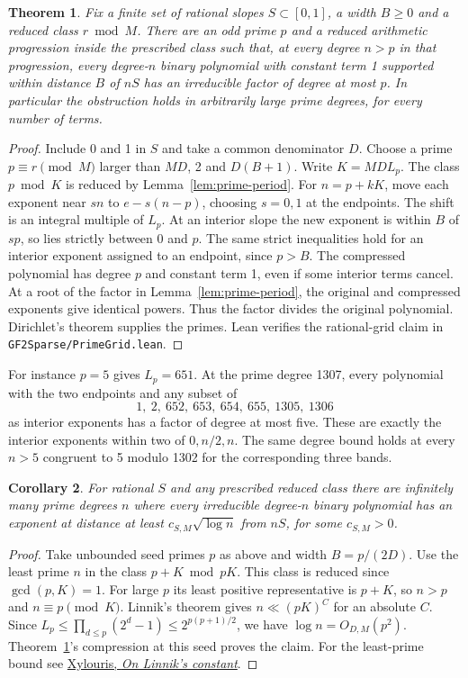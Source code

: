 \documentclass[11pt]{article}
\newtheorem{theorem}{Theorem}
\newtheorem{corollary}[theorem]{Corollary}
\begin{document}
\begin{theorem}\label{thm:prime-grid}
Fix a finite set of rational slopes \(S\subset[0,1]\), a width \(B\ge0\)
and a reduced class \(r\bmod M\). There are an odd prime \(p\) and a
reduced arithmetic progression inside the prescribed class such that,
at every degree \(n>p\) in that progression, every degree-\(n\) binary
polynomial with constant term 1 supported within distance \(B\) of
\(nS\) has an irreducible factor of degree at most \(p\).
In particular the obstruction holds in arbitrarily large prime degrees,
for every number of terms.
\end{theorem}
\begin{proof}
Include 0 and 1 in \(S\) and take a common denominator \(D\).
Choose a prime \(p\equiv r\pmod M\) larger than \(MD\), 2 and
\(D(B+1)\). Write \(K=MDL_p\). The class \(p\bmod K\) is reduced by
Lemma~\ref{lem:prime-period}. For \(n=p+kK\), move each exponent near
\(sn\) to \(e-s(n-p)\), choosing \(s=0,1\) at the endpoints. The shift
is an integral multiple of \(L_p\). At an interior slope the new
exponent is within \(B\) of \(sp\), so lies strictly between 0 and \(p\).
The same strict inequalities hold for an interior exponent assigned
to an endpoint, since \(p>B\).
The compressed polynomial has degree \(p\) and constant term 1, even
if some interior terms cancel. At a root of the factor in
Lemma~\ref{lem:prime-period}, the original and compressed exponents
give identical powers. Thus the factor divides the original polynomial.
Dirichlet's theorem supplies the primes. Lean verifies the rational-grid
claim in \nolinkurl{GF2Sparse/PrimeGrid.lean}.
\end{proof}

For instance \(p=5\) gives \(L_p=651\). At the prime degree 1307,
every polynomial with the two endpoints and any subset of
\[
               1,\ 2,\ 652,\ 653,\ 654,\ 655,\ 1305,\ 1306
\]
as interior exponents has a factor of degree at most five. These are
exactly the interior exponents within two of \(0,n/2,n\).
The same degree bound holds at every \(n>5\) congruent to 5 modulo 1302
for the corresponding three bands.

\begin{corollary}\label{cor:prime-grid-width}
For rational \(S\) and any prescribed reduced class there are infinitely
many prime degrees \(n\) where every irreducible degree-\(n\) binary
polynomial has an exponent at distance at least
\(c_{S,M}\sqrt{\log n}\) from \(nS\), for some \(c_{S,M}>0\).
\end{corollary}
\begin{proof}
Take unbounded seed primes \(p\) as above and width \(B=p/(2D)\).
Use the least prime \(n\) in the class \(p+K\bmod pK\).
This class is reduced since \(\gcd(p,K)=1\). For large \(p\) its least
positive representative is \(p+K\), so \(n>p\) and \(n\equiv p\pmod K\).
Linnik's theorem gives \(n\ll(pK)^C\) for an absolute \(C\).
Since \(L_p\le\prod_{d\le p}(2^d-1)\le2^{p(p+1)/2}\), we have
\(\log n=O_{D,M}(p^2)\). Theorem~\ref{thm:prime-grid}'s compression
at this seed proves the claim. For the least-prime bound see
\href{https://arxiv.org/abs/0906.2749}{Xylouris, \emph{On Linnik's constant}}.
\end{proof}
\end{document}
